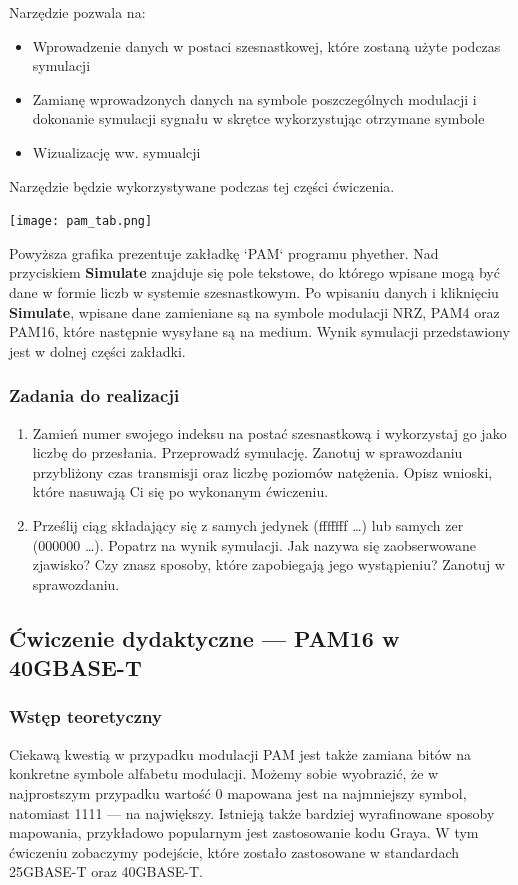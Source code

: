 Narzędzie pozwala na:
\begin{itemize}
    \item Wprowadzenie danych w postaci szesnastkowej, które zostaną użyte podczas symulacji
    \item Zamianę wprowadzonych danych na symbole poszczególnych modulacji i dokonanie
        symulacji sygnału w skrętce wykorzystując otrzymane symbole
    \item Wizualizację ww. symualcji
\end{itemize}

Narzędzie będzie wykorzystywane podczas tej części ćwiczenia.

\texttt{[image: pam\_tab.png]}

Powyższa grafika prezentuje zakładkę `PAM` programu phyether. Nad przyciskiem \textbf{Simulate} znajduje się pole tekstowe, do którego wpisane mogą być dane w formie
liczb w systemie szesnastkowym. Po wpisaniu danych i kliknięciu \textbf{Simulate}, wpisane dane zamieniane są na symbole modulacji NRZ, PAM4 oraz PAM16, które
następnie wysyłane są na medium. Wynik symulacji przedstawiony jest w dolnej części zakładki.

\subsubsection{Zadania do realizacji}

\begin{enumerate}
    \item Zamień numer swojego indeksu na postać szesnastkową i wykorzystaj go jako liczbę do przesłania. Przeprowadź symulację. Zanotuj w sprawozdaniu
    przybliżony czas transmisji oraz liczbę poziomów natężenia. Opisz wnioski, które nasuwają Ci się po wykonanym ćwiczeniu.
    \item Prześlij ciąg składający się z samych jedynek (fffffff \dots) lub samych zer (000000 \dots). Popatrz na wynik symulacji. Jak nazywa się zaobserwowane zjawisko? Czy znasz sposoby,
    które zapobiegają jego wystąpieniu? Zanotuj w sprawozdaniu.
\end{enumerate}

\subsection{Ćwiczenie dydaktyczne --- PAM16 w 40GBASE-T}
\subsubsection{Wstęp teoretyczny}
Ciekawą kwestią w przypadku modulacji PAM jest także zamiana bitów na konkretne symbole alfabetu modulacji.
Możemy sobie wyobrazić, że w najprostszym przypadku wartość 0 mapowana jest na najmniejszy symbol, natomiast 1111
--- na największy. Istnieją także bardziej wyrafinowane sposoby mapowania, przykładowo popularnym jest zastosowanie kodu Graya.
W tym ćwiczeniu zobaczymy podejście, które zostało zastosowane w standardach 25GBASE-T oraz 40GBASE-T.

